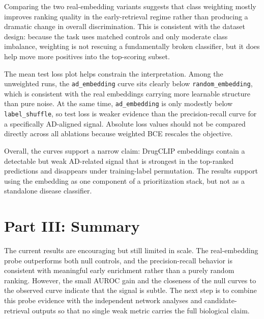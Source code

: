 \documentclass{article}
\begin{document}
Comparing the two real-embedding variants suggests that class weighting mostly improves ranking quality in the early-retrieval regime rather than producing a dramatic change in overall discrimination. This is consistent with the dataset design: because the task uses matched controls and only moderate class imbalance, weighting is not rescuing a fundamentally broken classifier, but it does help move more positives into the top-scoring subset.

The mean test loss plot helps constrain the interpretation. Among the unweighted runs, the \texttt{ad\_embedding} curve sits clearly below \texttt{random\_embedding}, which is consistent with the real embeddings carrying more learnable structure than pure noise. At the same time, \texttt{ad\_embedding} is only modestly below \texttt{label\_shuffle}, so test loss is weaker evidence than the precision-recall curve for a specifically AD-aligned signal. Absolute loss values should not be compared directly across all ablations because weighted BCE rescales the objective.

Overall, the curves support a narrow claim: DrugCLIP embeddings contain a detectable but weak AD-related signal that is strongest in the top-ranked predictions and disappears under training-label permutation. The results support using the embedding as one component of a prioritization stack, but not as a standalone disease classifier.

\section*{Part III: Summary}
The current results are encouraging but still limited in scale. The real-embedding probe outperforms both null controls, and the precision-recall behavior is consistent with meaningful early enrichment rather than a purely random ranking. However, the small AUROC gain and the closeness of the null curves to the observed curve indicate that the signal is subtle. The next step is to combine this probe evidence with the independent network analyses and candidate-retrieval outputs so that no single weak metric carries the full biological claim.



\end{document}
